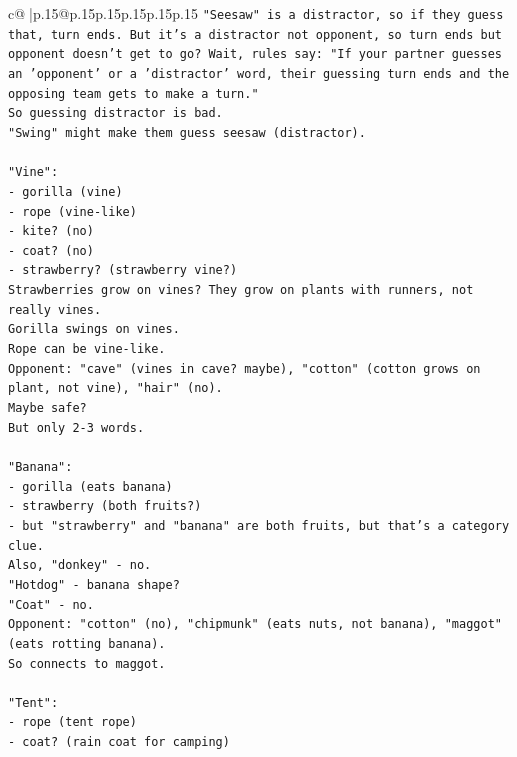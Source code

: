 \documentclass{article}
\begin{document}
{\begin{supertabular}{c@{$\;$}|p{.15\linewidth}@{}p{.15\linewidth}p{.15\linewidth}p{.15\linewidth}p{.15\linewidth}p{.15\linewidth}}
{{{\texttt{"Seesaw" is a distractor, so if they guess that, turn ends. But it's a distractor not opponent, so turn ends but opponent doesn't get to go? Wait, rules say: "If your partner guesses an 'opponent' or a 'distractor' word, their guessing turn ends and the opposing team gets to make a turn."} \\
\texttt{So guessing distractor is bad.} \\
\texttt{"Swing" might make them guess seesaw (distractor).} \\
\\ 
\texttt{"Vine":} \\
\texttt{{-} gorilla (vine)} \\
\texttt{{-} rope (vine{-}like)} \\
\texttt{{-} kite? (no)} \\
\texttt{{-} coat? (no)} \\
\texttt{{-} strawberry? (strawberry vine?)} \\
\texttt{Strawberries grow on vines? They grow on plants with runners, not really vines.} \\
\texttt{Gorilla swings on vines.} \\
\texttt{Rope can be vine{-}like.} \\
\texttt{Opponent: "cave" (vines in cave? maybe), "cotton" (cotton grows on plant, not vine), "hair" (no).} \\
\texttt{Maybe safe?} \\
\texttt{But only 2{-}3 words.} \\
\\ 
\texttt{"Banana":} \\
\texttt{{-} gorilla (eats banana)} \\
\texttt{{-} strawberry (both fruits?)} \\
\texttt{{-} but "strawberry" and "banana" are both fruits, but that's a category clue.} \\
\texttt{Also, "donkey" {-} no.} \\
\texttt{"Hotdog" {-} banana shape?} \\
\texttt{"Coat" {-} no.} \\
\texttt{Opponent: "cotton" (no), "chipmunk" (eats nuts, not banana), "maggot" (eats rotting banana).} \\
\texttt{So connects to maggot.} \\
\\ 
\texttt{"Tent":} \\
\texttt{{-} rope (tent rope)} \\
\texttt{{-} coat? (rain coat for camping)} \\
}}}
\end{supertabular}}
\end{document}

